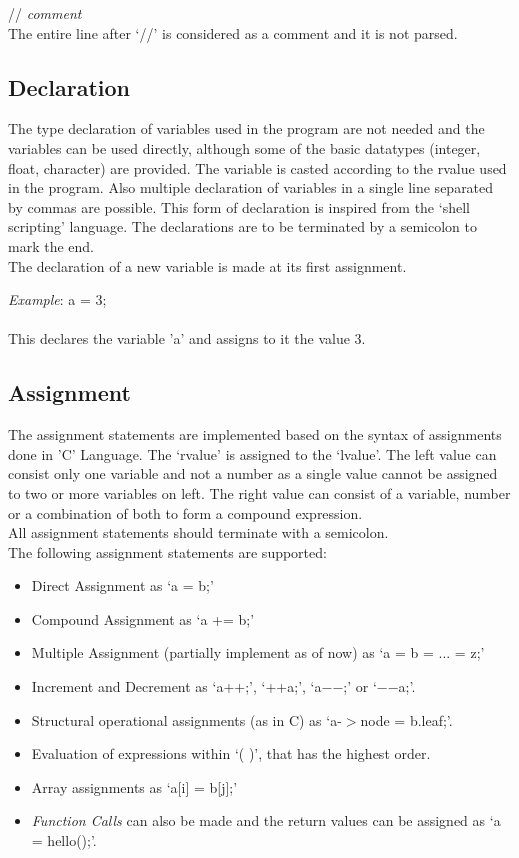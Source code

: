 \documentclass[12pt, oneside, a4paper]{article}
\begin{document}
\hspace{1in}  // \emph{comment}\\

The entire line after `//' is considered as a comment and it is not parsed.

\subsection{Declaration}
The type declaration of variables used in the program are not needed and the variables can be used directly, although some of the basic datatypes (integer, float, character) are provided.  The variable is casted according to the rvalue used in the program.  Also multiple declaration of variables in a single line separated by commas are possible.  This form of declaration is inspired from the `shell scripting' language.  The declarations are to be terminated by a semicolon to mark the end.\\

The declaration of a new variable is made at its first assignment.

\emph{Example}: a = 3;\\\\
This declares the variable 'a' and assigns to it the value 3.

\subsection{Assignment}
The assignment statements are implemented based on the syntax of assignments done in 'C' Language.  The `rvalue' is assigned to the `lvalue'.  The left value can consist only one variable and not a number as a single value cannot be assigned to two or more variables on left.  The right value can consist of a variable, number or a combination of both to form a compound expression.\\

All assignment statements should terminate with a semicolon.\\

The following assignment statements are supported:\\
\begin{itemize}
\item Direct Assignment as `a = b;'
\item Compound Assignment as `a += b;'
\item Multiple Assignment (partially implement as of now) as `a = b = ... = z;'
\item Increment and Decrement as `a++;', `++a;', `a$-$$-$;' or `$-$$-$a;'.
\item Structural operational assignments (as in C) as `a-$>$node = b.leaf;'.
\item Evaluation of expressions within `( )', that has the highest order.
\item Array assignments as `a[i] = b[j];'
\item \emph{Function Calls} can also be made and the return values can be assigned as `a = hello();'.
\end{itemize}
\end{document}

